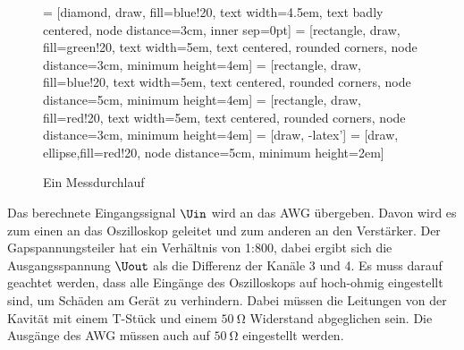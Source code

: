 \documentclass[../Report.tex]{subfiles}
\begin{document}
\begin{figure}[H]
\centering

 = [diamond, draw, fill=blue!20, 
    text width=4.5em, text badly centered, node distance=3cm, inner sep=0pt]
 = [rectangle, draw, fill=green!20, 
    text width=5em, text centered, rounded corners, node distance=3cm, minimum height=4em]
 = [rectangle, draw, fill=blue!20, 
    text width=5em, text centered, rounded corners, node distance=5cm, minimum height=4em]
 = [rectangle, draw, fill=red!20, 
    text width=5em, text centered, rounded corners, node distance=3cm, minimum height=4em]
 = [draw, -latex']
 = [draw, ellipse,fill=red!20, node distance=5cm,
    minimum height=2em]
    
\caption{Ein Messdurchlauf}
  	\label{fig:Messung}
\end{figure}

\noindent
Das berechnete Eingangssignal $\Uin$ wird an das AWG übergeben. Davon wird es zum einen an das Oszilloskop geleitet und zum anderen an den Verstärker. Der Gapspannungsteiler hat ein Verhältnis von 1:800, dabei ergibt sich die Ausgangsspannung $\Uout$ als die Differenz der Kanäle 3 und 4. Es muss darauf geachtet werden, dass alle Eingänge des Oszilloskops auf hoch-ohmig eingestellt sind, um Schäden am Gerät zu verhindern. Dabei müssen die Leitungen von der Kavität mit einem T-Stück und einem $\SI{50}{\ohm}$ Widerstand abgeglichen sein. Die Ausgänge des AWG müssen auch auf $\SI{50}{\ohm}$ eingestellt werden.
\end{document}
